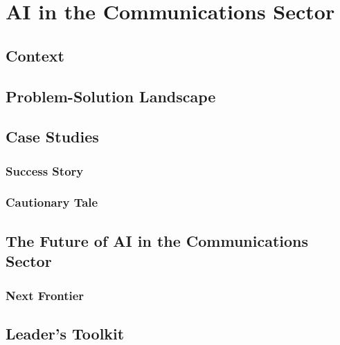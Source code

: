 \chapter{AI in the Communications Sector}
\label{chap:ai_in_communications}

\section{Context}
\label{sec:communications_context}

\section{Problem-Solution Landscape}
\label{sec:communications_problem_solution}

\section{Case Studies}
\label{sec:communications_case_studies}
\subsection{Success Story}
\label{sec:communications_success_story}
\subsection{Cautionary Tale}
\label{sec:communications_cautionary_tale}

\section{The Future of AI in the Communications Sector}
\label{sec:future_of_ai_in_communications}
\subsection{Next Frontier}
\label{sec:communications_next_frontier}

\section{Leader's Toolkit}
\label{sec:communications_leaders_toolkit}